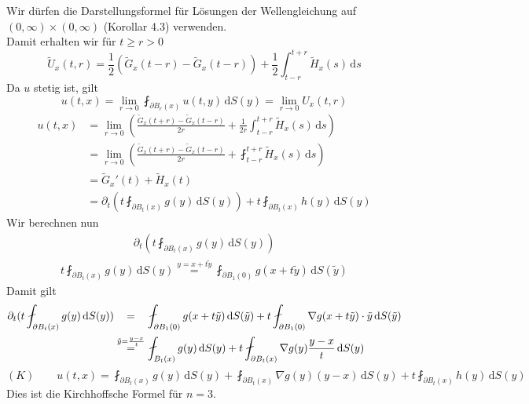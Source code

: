 Wir dürfen die Darstellungsformel für Lösungen der Wellengleichung auf $(0,\infty) \times (0,\infty)$ (Korollar 4.3) verwenden. \\
Damit erhalten wir für $t \geq r > 0$
\[
	\tilde U_x(t,r) = \frac{1}{2} ( \tilde G_x(t-r)- \tilde G_x(t-r)) + \frac{1}{2} \int_{t-r}^{t+r} \tilde H_x(s) \,\mathrm{d}s
\]
Da $u$ stetig ist, gilt
\[
	u(t,x)= \lim_{r \to 0} \fint_{\partial B_r(x)}^{} u(t,y) \,\mathrm{d}S(y) = \lim_{r \to 0} U_x(t,r)
\]
\begin{align*}
	u(t,x) &= \lim_{r \to 0} \left( \frac{\tilde G_x(t+r)- \tilde G_x(t-r)}{2 r} + \frac{1}{2r} \int_{t-r}^{t+r} \tilde H_x(s) \,\mathrm{d}s \right) \\
	&= \lim_{r \to 0} \left( \frac{\tilde G_x(t+r) - \tilde G_x(t-r)}{2r} + \fint_{t-r}^{t+r} \tilde H_x(s) \,\mathrm{d}s \right) \\
	&= \tilde G_x'(t) + \tilde H_x(t) \\
	&= \partial_t \left( t \fint_{\partial B_t(x)}^{} g(y) \,\mathrm{d}S(y) \right) + t \fint_{\partial B_t(x)}^{} h(y) \,\mathrm{d}S(y)
\end{align*}
Wir berechnen nun 
\begin{align*}
	\partial_t \left(t \fint_{\partial B_t(x)}^{} g(y) \,\mathrm{d}S(y) \right)
\end{align*}
\begin{align*}
 t \fint_{\partial B_t(x)}^{} g(y) \,\mathrm{d}S(y)
	\stackrel{y= x+t \tilde y}{=} \fint_{\partial B_1(0)}^{} g(x + t \tilde y) \,\mathrm{d}S( \tilde y)
\end{align*}
Damit gilt
\begin{align*}
	\partial_t (t \fint_{\partial B_t(x)}^{} g(y) \,\mathrm{d}S(y)) & 
	\stackrel{\hphantom{\tilde y = \frac{y-x}{t}}}{=} \fint_{\partial B_1(0)}^{} g(x+t \tilde y) \,\mathrm{d}S( \tilde y) 
	+  t \fint_{\partial B_1(0)}^{}  \nabla g(x + t \tilde y) \cdot \tilde y \,\mathrm{d}S( \tilde y) \\
	& \stackrel{\tilde y = \frac{y-x}{t}}{=} \fint_{B_t(x)}^{} g(y) \,\mathrm{d}S(y) + t \fint_{\partial B_t(x)}^{}  \nabla g(y) \frac{y-x}{t} \,\mathrm{d}S(y)
\end{align*}
\[
	(K) \qquad u(t,x)= \fint_{\partial B_t(x)}^{} g(y) \,\mathrm{d}S(y) + \fint_{\partial B_t(x)}^{}  \nabla g(y) (y-x) \,\mathrm{d}S(y) + t \fint_{\partial B_t(x)}^{} h(y) \,\mathrm{d}S(y)
\]
Dies ist die Kirchhoffsche Formel für $n=3$.

